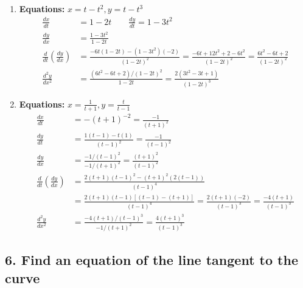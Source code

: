 \documentclass[12pt]{article}
\newcommand{\questiontitle}[1]{\subsection*{#1}}
\begin{document}
\begin{enumerate}[label=\alph*.]
    \item \textbf{Equations:} $x=t-t^2, y=t-t^3$
    \begin{align*}
        \frac{dx}{dt} &= 1-2t \quad \quad \frac{dy}{dt} = 1-3t^2 \\
        \frac{dy}{dx} &= \frac{1-3t^2}{1-2t} \\
        \frac{d}{dt}\left(\frac{dy}{dx}\right) &= \frac{-6t(1-2t) - (1-3t^2)(-2)}{(1-2t)^2} = \frac{-6t+12t^2+2-6t^2}{(1-2t)^2} = \frac{6t^2-6t+2}{(1-2t)^2} \\
        \frac{d^2y}{dx^2} &= \frac{(6t^2-6t+2)/(1-2t)^2}{1-2t} = \frac{2(3t^2-3t+1)}{(1-2t)^3}
    \end{align*}

    \item \textbf{Equations:} $x=\frac{1}{t+1}, y=\frac{t}{t-1}$
    \begin{align*}
        \frac{dx}{dt} &= -(t+1)^{-2} = \frac{-1}{(t+1)^2} \\
        \frac{dy}{dt} &= \frac{1(t-1)-t(1)}{(t-1)^2} = \frac{-1}{(t-1)^2} \\
        \frac{dy}{dx} &= \frac{-1/(t-1)^2}{-1/(t+1)^2} = \frac{(t+1)^2}{(t-1)^2} \\
        \frac{d}{dt}\left(\frac{dy}{dx}\right) &= \frac{2(t+1)(t-1)^2 - (t+1)^2(2(t-1))}{(t-1)^4} \\
        &= \frac{2(t+1)(t-1)[(t-1)-(t+1)]}{(t-1)^4} = \frac{2(t+1)(-2)}{(t-1)^3} = \frac{-4(t+1)}{(t-1)^3} \\
        \frac{d^2y}{dx^2} &= \frac{-4(t+1)/(t-1)^3}{-1/(t+1)^2} = \frac{4(t+1)^3}{(t-1)^3}
    \end{align*}
\end{enumerate}

\newpage
\questiontitle{6. Find an equation of the line tangent to the curve}
\end{document}
